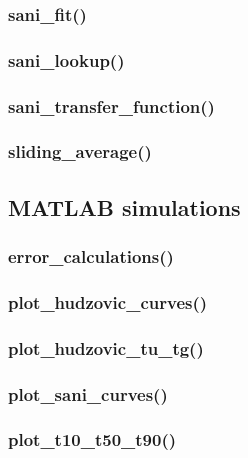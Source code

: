 \subsubsection{sani\_fit()}


\subsubsection{sani\_lookup()}


\subsubsection{sani\_transfer\_function()}


\subsubsection{sliding\_average()}



\subsection{MATLAB simulations}

\subsubsection{error\_calculations()}


\subsubsection{plot\_hudzovic\_curves()}


\subsubsection{plot\_hudzovic\_tu\_tg()}


\subsubsection{plot\_sani\_curves()}


\subsubsection{plot\_t10\_t50\_t90()}


